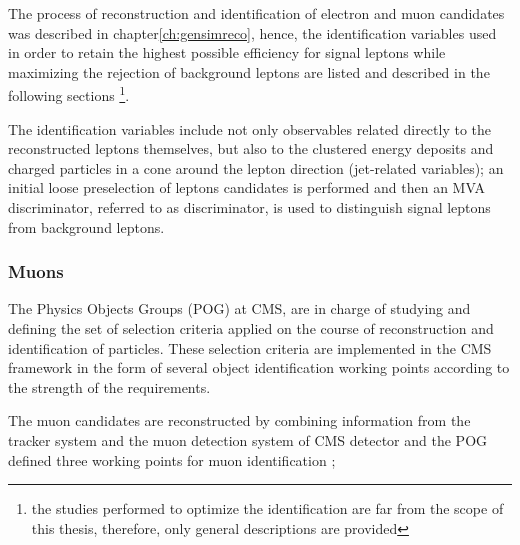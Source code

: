 The process of reconstruction and identification of electron and muon candidates was described in chapter\ref{ch:gensimreco}, hence, the identification variables used in order to retain the highest possible efficiency for signal leptons while maximizing the rejection of background leptons are listed and described in the following sections \footnote{the studies performed to optimize the identification are far from the scope of this thesis, therefore, only general descriptions are provided}.

The identification variables include not only observables related directly to the reconstructed leptons themselves, but also to the clustered energy deposits and charged particles in a cone around the lepton direction (jet-related variables); an initial loose preselection of leptons candidates is performed and then an MVA discriminator, referred to as  discriminator, is used to distinguish signal leptons from background leptons.

\subsubsection*{Muons}

The Physics Objects Groups (POG) at CMS, are in charge of studying and defining the set of selection criteria applied on the course of reconstruction and identification of particles. These selection criteria are implemented in the CMS framework in the form of several object identification working points according to the strength of the requirements.

The muon candidates are reconstructed by combining information from the tracker system and the muon detection system of CMS detector and the POG defined three working points for muon identification \cite{muid};

